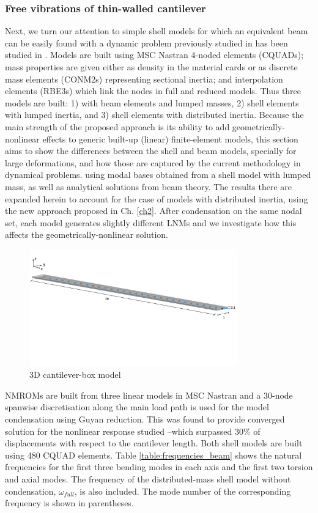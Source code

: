 \documentclass[11pt]{article}
\begin{document}
\subsubsection{Free vibrations of thin-walled cantilever}
%
Next, we turn our attention to simple shell models for which an equivalent beam can be easily found with a dynamic problem previously studied in has been studied in \cite{Wang2015, PALACIOS2019}. Models are built using MSC Nastran 4-noded elements (CQUADs); mass properties are given either as density in the material cards  or as discrete mass elements (CONM2s) representing sectional inertia; and interpolation elements (RBE3s) which link the nodes in full and reduced models.
Thus three models are built: 1) with beam elements and lumped masses, 2) shell elements with lumped inertia, and 3) shell elements with distributed inertia.
%
Because the main strength of the proposed approach is its ability to add geometrically-nonlinear effects to  generic built-up (linear) finite-element models, this section aims to show the differences between the shell and beam models, specially for large deformations, and how those are captured by the current methodology in dynamical problems.
  using modal bases obtained from a shell model with lumped mass, as well as analytical solutions from beam theory. The results there are expanded herein to account for the case of models with distributed inertia, using the new approach proposed in Ch. \ref{ch2}. After condensation on the same nodal set, each model generates slightly different LNMs and we investigate how this affects the geometrically-nonlinear solution.
%
\begin{figure}[h!]
\centering
\includegraphics[width=0.8\textwidth]{./img/cantilever30e}
\caption{3D cantilever-box model}\label{fig:cantilever}
\end{figure}
%
NMROMs are built from three linear models in MSC Nastran and a 30-node spanwise discretisation along the main load path is used for the model condensation using Guyan reduction. This was found to provide converged solution for the nonlinear response studied --which surpassed 30$\%$ of displacements with respect to the cantilever length. Both shell models are built using 480 CQUAD elements. Table \ref{table:frequencies_beam} shows the natural frequencies for the first three bending modes in each axis and the first two torsion and axial modes. The frequency of the distributed-mass shell model  without condensation, $\omega_{full}$, is also included. The mode number of the corresponding frequency is shown in parentheses.
\end{document}
